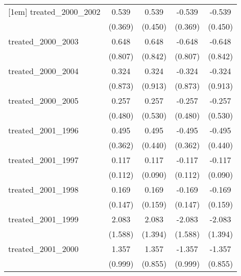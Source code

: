 {\begin{tabular}{l*{4}{c}}
[1em]
treated\_2000\_2002&       0.539         &       0.539         &      -0.539         &      -0.539         \\
            &     (0.369)         &     (0.450)         &     (0.369)         &     (0.450)         \\
[1em]
treated\_2000\_2003&       0.648         &       0.648         &      -0.648         &      -0.648         \\
            &     (0.807)         &     (0.842)         &     (0.807)         &     (0.842)         \\
[1em]
treated\_2000\_2004&       0.324         &       0.324         &      -0.324         &      -0.324         \\
            &     (0.873)         &     (0.913)         &     (0.873)         &     (0.913)         \\
[1em]
treated\_2000\_2005&       0.257         &       0.257         &      -0.257         &      -0.257         \\
            &     (0.480)         &     (0.530)         &     (0.480)         &     (0.530)         \\
[1em]
treated\_2001\_1996&       0.495         &       0.495         &      -0.495         &      -0.495         \\
            &     (0.362)         &     (0.440)         &     (0.362)         &     (0.440)         \\
[1em]
treated\_2001\_1997&       0.117         &       0.117         &      -0.117         &      -0.117         \\
            &     (0.112)         &     (0.090)         &     (0.112)         &     (0.090)         \\
[1em]
treated\_2001\_1998&       0.169         &       0.169         &      -0.169         &      -0.169         \\
            &     (0.147)         &     (0.159)         &     (0.147)         &     (0.159)         \\
[1em]
treated\_2001\_1999&       2.083         &       2.083         &      -2.083         &      -2.083         \\
            &     (1.588)         &     (1.394)         &     (1.588)         &     (1.394)         \\
[1em]
treated\_2001\_2000&       1.357         &       1.357         &      -1.357         &      -1.357         \\
            &     (0.999)         &     (0.855)         &     (0.999)         &     (0.855)         \\

\end{tabular}}
